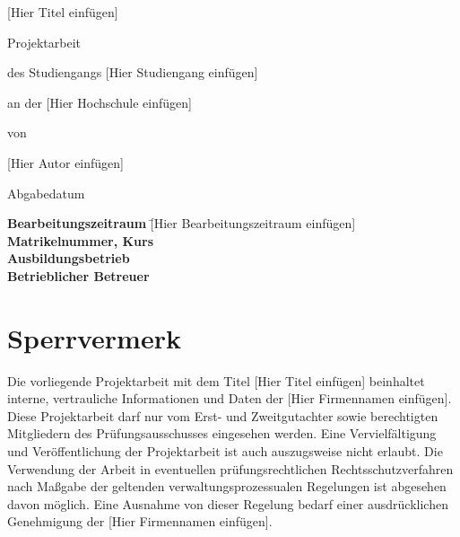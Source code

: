 \documentclass[a4paper, 12pt]{article}
\begin{document}
\begin{titlepage}
    \vspace*{0.5cm}
    \centering
    
    {\Huge [Hier Titel einfügen]\par}
    \vspace{1.5cm}
    {\huge Projektarbeit\par}
    \vspace{1.25cm}
    {\Large des Studiengangs [Hier Studiengang einfügen]\par}
    {\Large an der [Hier Hochschule einfügen]\par}
    \vspace{1cm}
    {\Large von \par}
    {\Large [Hier Autor einfügen] \par}
    \vspace{1cm}
    {\Large Abgabedatum  \par}
    \vspace{3cm}
    {\large
        \begin{tabbing}
            \textbf{Bearbeitungszeitraum} \qquad \qquad \qquad \= [Hier Bearbeitungszeitraum einfügen]\\
            \textbf{Matrikelnummer, Kurs}  \\
            \textbf{Ausbildungsbetrieb}  \\
            \textbf{Betrieblicher Betreuer} 
        \end{tabbing}
    \par}
    \vspace{1cm}
    \vfill
\end{titlepage}

\pagebreak

\pagebreak
\section*{Sperrvermerk}
Die vorliegende Projektarbeit mit dem Titel [Hier Titel einfügen] beinhaltet interne, vertrauliche Informationen und Daten der [Hier Firmennamen einfügen].
Diese Projektarbeit darf nur vom Erst- und Zweitgutachter sowie berechtigten Mitgliedern des Prüfungsausschusses eingesehen werden. 
Eine Vervielfältigung und Veröffentlichung der Projektarbeit ist auch auszugsweise nicht erlaubt. 
Die Verwendung der Arbeit in eventuellen prüfungsrechtlichen Rechtsschutzverfahren nach Maßgabe der geltenden verwaltungsprozessualen Regelungen ist abgesehen davon möglich.
Eine Ausnahme von dieser Regelung bedarf einer ausdrücklichen Genehmigung der [Hier Firmennamen einfügen].
\end{document}
